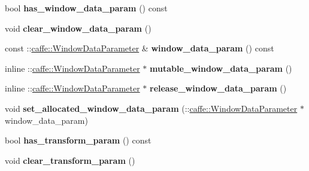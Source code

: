 \begin{DoxyCompactItemize}
bool {\bfseries has\+\_\+window\+\_\+data\+\_\+param} () const
\item 
\mbox{\label{classcaffe_1_1_v1_layer_parameter_a360d10265f2503734338d2b86f3bf833}} 
void {\bfseries clear\+\_\+window\+\_\+data\+\_\+param} ()
\item 
\mbox{\label{classcaffe_1_1_v1_layer_parameter_a8cae06b535c92093faf830f4fb5b4ec8}} 
const \+::\mbox{\hyperlink{classcaffe_1_1_window_data_parameter}{caffe\+::\+Window\+Data\+Parameter}} \& {\bfseries window\+\_\+data\+\_\+param} () const
\item 
\mbox{\label{classcaffe_1_1_v1_layer_parameter_a0bae51efa64304ce3fb6e350da0fc784}} 
inline \+::\mbox{\hyperlink{classcaffe_1_1_window_data_parameter}{caffe\+::\+Window\+Data\+Parameter}} $\ast$ {\bfseries mutable\+\_\+window\+\_\+data\+\_\+param} ()
\item 
\mbox{\label{classcaffe_1_1_v1_layer_parameter_aa9d80e9ebd289b08408ede30f5838868}} 
inline \+::\mbox{\hyperlink{classcaffe_1_1_window_data_parameter}{caffe\+::\+Window\+Data\+Parameter}} $\ast$ {\bfseries release\+\_\+window\+\_\+data\+\_\+param} ()
\item 
\mbox{\label{classcaffe_1_1_v1_layer_parameter_a52c7abb113b6f8db8124d0d885e566c6}} 
void {\bfseries set\+\_\+allocated\+\_\+window\+\_\+data\+\_\+param} (\+::\mbox{\hyperlink{classcaffe_1_1_window_data_parameter}{caffe\+::\+Window\+Data\+Parameter}} $\ast$window\+\_\+data\+\_\+param)
\item 
\mbox{\label{classcaffe_1_1_v1_layer_parameter_a6e22e627e9638dc642fa771c3b0e88c0}} 
bool {\bfseries has\+\_\+transform\+\_\+param} () const
\item 
\mbox{\label{classcaffe_1_1_v1_layer_parameter_a61206672389a0e9768ad3ebe8d2e56ac}} 
void {\bfseries clear\+\_\+transform\+\_\+param} ()
\item 
\mbox{\label{classcaffe_1_1_v1_layer_parameter_ae76ad2a5c5e5c839ed8db76697ef41ab}} 

\end{DoxyCompactItemize}
